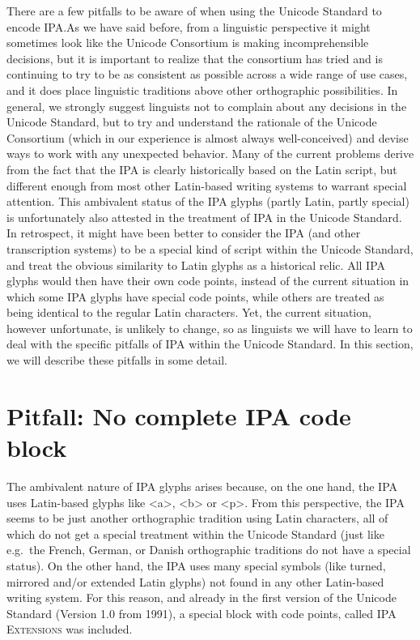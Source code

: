 There are a few pitfalls to be aware of when using the Unicode Standard to
encode IPA.\@ As we have said before, from a linguistic perspective it might
sometimes look like the Unicode Consortium is making incomprehensible decisions,
but it is important to realize that the consortium has tried and is continuing
to try to be as consistent as possible across a wide range of use cases, and it
does place linguistic traditions above other orthographic possibilities. In
general, we strongly suggest linguists not to complain about any decisions in
the Unicode Standard, but to try and understand the rationale of the Unicode
Consortium (which in our experience is almost always well-conceived) and devise
ways to work with any unexpected behavior. Many of the current problems derive
from the fact that the IPA is clearly historically based on the Latin script,
but different enough from most other Latin-based writing systems to warrant
special attention. This ambivalent status of the IPA glyphs (partly Latin,
partly special) is unfortunately also attested in the treatment of IPA in the
Unicode Standard. In retrospect, it might have been better to consider the IPA
(and other transcription systems) to be a special kind of script within
the Unicode Standard, and treat the obvious similarity to Latin glyphs as a
historical relic. All IPA glyphs would then have their own code points, instead
of the current situation in which some IPA glyphs have special code points,
while others are treated as being identical to the regular Latin characters.
Yet, the current situation, however unfortunate, is unlikely to change, so as
linguists we will have to learn to deal with the specific pitfalls of IPA within
the Unicode Standard. In this section, we will describe these pitfalls in some
detail.

\section{Pitfall: No complete IPA code block}
\label{pitfall-no-complete-ipa-block}

The ambivalent nature of IPA glyphs arises because, on the one hand, the IPA
uses Latin-based glyphs like <a>, <b> or <p>. From this perspective, the IPA
seems to be just another orthographic tradition using Latin characters, all of
which do not get a special treatment within the Unicode Standard (just like
e.g.~the French, German, or Danish orthographic traditions do not have a special
status). On the other hand, the IPA uses many special symbols (like turned,
mirrored and/or extended Latin glyphs) not found in any other Latin-based
writing system. For this reason, and already in the first version of the Unicode
Standard (Version 1.0 from 1991), a special block with code points, called
\textsc{IPA Extensions} was included. 

